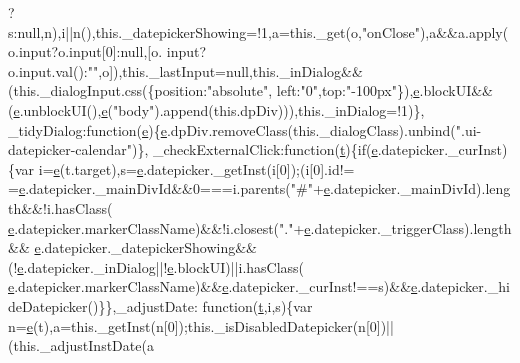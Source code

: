 \begin{DoxyCode}
      ?s:null,n),i||n(),this.\_datepickerShowing=!1,a=this.\_get(o,\textcolor{stringliteral}{"onClose"}),a&&a.apply(o.input?o.input[0]:null,[o.
      input?o.input.val():\textcolor{stringliteral}{""},o]),this.\_lastInput=null,this.\_inDialog&&(this.\_dialogInput.css(\{position:\textcolor{stringliteral}{"absolute"},
      left:\textcolor{stringliteral}{"0"},top:\textcolor{stringliteral}{"-100px"}\}),\hyperlink{jquery-ui_8min_8js_a2c038346d47955cbe2cb91e338edd7e1}{e}.blockUI&&(\hyperlink{jquery-ui_8min_8js_a2c038346d47955cbe2cb91e338edd7e1}{e}.unblockUI(),\hyperlink{jquery-ui_8min_8js_a2c038346d47955cbe2cb91e338edd7e1}{e}(\textcolor{stringliteral}{"body"}).append(this.dpDiv))),this.\_inDialog=!1)\},
      \_tidyDialog:\textcolor{keyword}{function}(\hyperlink{jquery-ui_8min_8js_a2c038346d47955cbe2cb91e338edd7e1}{e})\{\hyperlink{jquery-ui_8min_8js_a2c038346d47955cbe2cb91e338edd7e1}{e}.dpDiv.removeClass(this.\_dialogClass).unbind(\textcolor{stringliteral}{".ui-datepicker-calendar"})\},
      \_checkExternalClick:\textcolor{keyword}{function}(\hyperlink{jquery-2_80_83_8min_8js_aaccc9105df5383111407fd5b41255e23}{t})\{\textcolor{keywordflow}{if}(\hyperlink{jquery-ui_8min_8js_a2c038346d47955cbe2cb91e338edd7e1}{e}.datepicker.\_curInst)\{var i=\hyperlink{jquery-ui_8min_8js_a2c038346d47955cbe2cb91e338edd7e1}{e}(t.target),s=\hyperlink{jquery-ui_8min_8js_a2c038346d47955cbe2cb91e338edd7e1}{e}.datepicker.\_getInst(i[0]);(i[0].id!=
      =\hyperlink{jquery-ui_8min_8js_a2c038346d47955cbe2cb91e338edd7e1}{e}.datepicker.\_mainDivId&&0===i.parents(\textcolor{stringliteral}{"#"}+\hyperlink{jquery-ui_8min_8js_a2c038346d47955cbe2cb91e338edd7e1}{e}.datepicker.\_mainDivId).length&&!i.hasClass(
      \hyperlink{jquery-ui_8min_8js_a2c038346d47955cbe2cb91e338edd7e1}{e}.datepicker.markerClassName)&&!i.closest(\textcolor{stringliteral}{"."}+\hyperlink{jquery-ui_8min_8js_a2c038346d47955cbe2cb91e338edd7e1}{e}.datepicker.\_triggerClass).length&&
      \hyperlink{jquery-ui_8min_8js_a2c038346d47955cbe2cb91e338edd7e1}{e}.datepicker.\_datepickerShowing&&(!\hyperlink{jquery-ui_8min_8js_a2c038346d47955cbe2cb91e338edd7e1}{e}.datepicker.\_inDialog||!\hyperlink{jquery-ui_8min_8js_a2c038346d47955cbe2cb91e338edd7e1}{e}.blockUI)||i.hasClass(
      \hyperlink{jquery-ui_8min_8js_a2c038346d47955cbe2cb91e338edd7e1}{e}.datepicker.markerClassName)&&\hyperlink{jquery-ui_8min_8js_a2c038346d47955cbe2cb91e338edd7e1}{e}.datepicker.\_curInst!==s)&&\hyperlink{jquery-ui_8min_8js_a2c038346d47955cbe2cb91e338edd7e1}{e}.datepicker.\_hideDatepicker()\}\},\_adjustDate:\textcolor{keyword}{
      function}(\hyperlink{jquery-2_80_83_8min_8js_aaccc9105df5383111407fd5b41255e23}{t},i,s)\{var n=\hyperlink{jquery-ui_8min_8js_a2c038346d47955cbe2cb91e338edd7e1}{e}(t),a=this.\_getInst(n[0]);this.\_isDisabledDatepicker(n[0])||(this.\_adjustInstDate(a

\end{DoxyCode}
